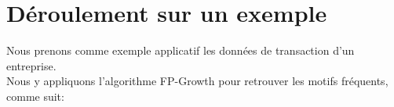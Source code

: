 \documentclass[12pt,a4paper,oneside]{book}
\begin{document}
\newpage


\section{Déroulement sur un exemple}
Nous prenons comme exemple applicatif les données de transaction d'un entreprise.\\
Nous y appliquons l'algorithme FP-Growth pour retrouver les motifs fréquents, comme suit:

\end{document}
